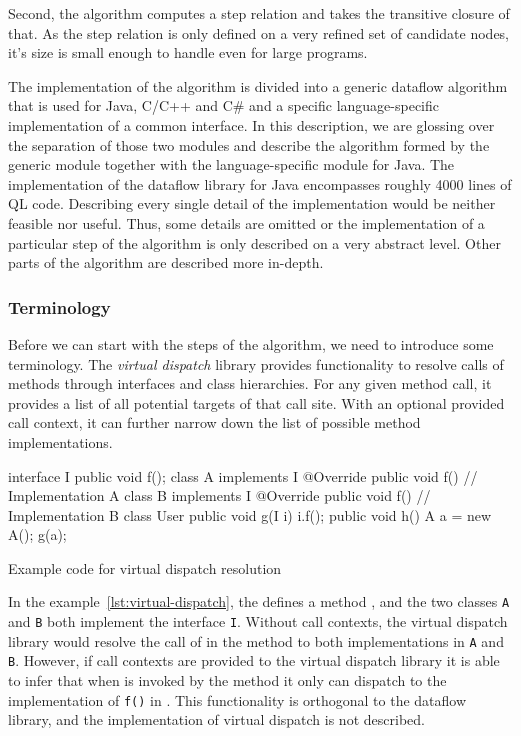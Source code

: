 Second, the algorithm computes a step relation and takes the transitive closure of that.
As the step relation is only defined on a very refined set of candidate nodes,
it's size is small enough to handle even for large programs.

The implementation of the algorithm is divided into a generic dataflow algorithm that is 
used for Java, C/C++ and C\# and a specific language-specific implementation of a common interface.
In this description, we are glossing over the separation of those two modules and 
describe the algorithm formed by the generic module together with the language-specific
module for Java.
The implementation of the dataflow library for Java encompasses roughly 4000 lines of
QL code. Describing every single detail of the implementation would be neither feasible nor 
useful. Thus, some details are omitted or the implementation of a particular step 
of the algorithm is only described on a very abstract level.
Other parts of the algorithm are described more in-depth.

\subsubsection*{Terminology}
Before we can start with the steps of the algorithm, we need to introduce some terminology.
The \emph{virtual dispatch} library provides functionality to resolve calls of 
methods through interfaces and class hierarchies.
For any given method call, it provides a list of all potential targets of that
call site.
With an optional provided call context, it can further narrow down the list of
possible method implementations.
\begin{listing}
    \begin{javacode}
interface I {
    public void f();
}
class A implements I {
    @Override
    public void f() {
        // Implementation A
    }
}
class B implements I {
    @Override
    public void f() {
        // Implementation B
    }
}
class User {
    public void g(I i) {
        i.f();
    }
    public void h() {
        A a = new A();
        g(a);
    }
}
    \end{javacode}
    \caption{Example code for virtual dispatch resolution}
    \label{lst:virtual-dispatch}
\end{listing}
In the example~\autoref{lst:virtual-dispatch}, the  defines a
 method , and the two 
classes \texttt{A} and \texttt{B} both implement the interface \texttt{I}.
Without call contexts, the virtual dispatch library would resolve the call 
of  in the method  to both 
implementations in \texttt{A} and \texttt{B}.
However, if call contexts are provided to the virtual dispatch library 
it is able to infer that when  is invoked by the method 
 it only can dispatch to the implementation of \texttt{f()} in 
.
This functionality is orthogonal to the dataflow library, and the implementation 
of virtual dispatch is not described.

